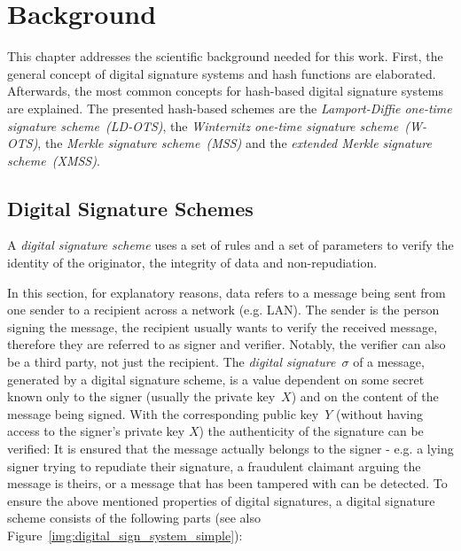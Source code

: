 \chapter{Background}
\label{cha:background}
This chapter addresses the scientific background needed for this work. First, the general concept of digital signature systems and hash functions are elaborated. Afterwards, the most common concepts for hash-based digital signature systems are explained. The presented hash-based schemes are the \textit{Lamport-Diffie one-time signature scheme~(LD-OTS)}, the \textit{Winternitz one-time signature scheme~(W-OTS)}, the \textit{Merkle signature scheme~(MSS)} and the \textit{extended Merkle signature scheme~(XMSS)}.

\section{Digital Signature Schemes}
A \textit{digital signature scheme} uses a set of rules and a set of parameters to verify the identity of the originator, the integrity of data and non-repudiation.~\cite{cha:bg_digital_sign_schemes_NIST_standard1992} 

In this section, for explanatory reasons, data refers to a message being sent from one sender to a recipient across a network (e.g. LAN). The sender is the person signing the message, the recipient usually wants to verify the received message, therefore they are referred to as signer and verifier. Notably, the verifier can also be a third party, not just the recipient.
The \textit{digital signature~$\sigma$} of a message, generated by a digital signature scheme, is a value dependent on some secret known only to the signer (usually the private key~$X$) and on the content of the message being signed. With the corresponding public key~$Y$ (without having access to the signer's private key $X$) the authenticity of the signature can be verified: It is ensured that the message actually belongs to the signer - e.g. a lying signer trying to repudiate their signature, a fraudulent claimant arguing the message is theirs, or a message that has been tampered with can be detected.
To ensure the above mentioned properties of digital signatures, a digital signature scheme consists of the following parts (see also Figure~\ref{img:digital_sign_system_simple}):~\cite{cha:bg_signature_schemes_book_menezes2018_1997} %

